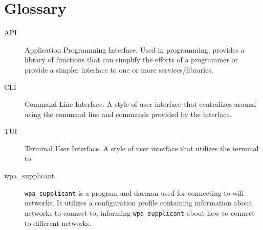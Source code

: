 \section{Glossary}

\begin{description}
  \item[API] Application Programming Interface. Used in programming, provides a 
    library of functions that can simplify the efforts of a programmer or provide
    a simpler interface to one or more services/libraries.
  \item[CLI] Command Line Interface. A style of user interface that centralizes 
    around using the command line and commands provided by the interface.
  \item[TUI] Terminal User Interface. A style of user interface that utilizes
    the terminal to 
  \item[wpa\_supplicant] \texttt{wpa\_supplicant} is a program and daemon
    used for connecting to wifi networks. It utilizes a configuration profile
    containing information about networks to connect to, informing \texttt{wpa\_supplicant}
    about how to connect to different networks.
\end{description}
